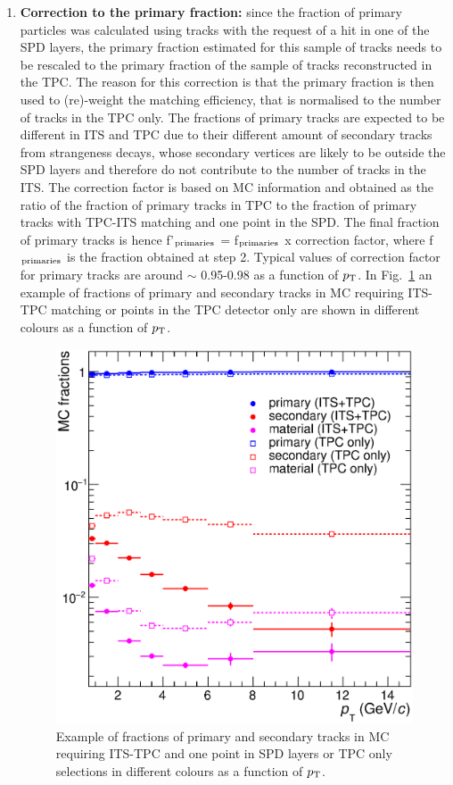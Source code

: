 \begin{enumerate}
\item {\bf Correction to the primary fraction:} since the fraction of primary
 particles was calculated using tracks with the request of a hit in one of the SPD layers, 
the primary fraction estimated for this sample of tracks 
needs to be rescaled to the primary fraction of the sample of tracks reconstructed in the TPC.
The reason for this correction is that the primary fraction is then used 
to (re)-weight the matching efficiency, that is normalised to the number of tracks in the TPC only. 
The fractions of primary tracks are expected to 
be different in ITS and TPC due to their different amount of 
secondary tracks from strangeness decays,
whose secondary vertices are likely to be outside the SPD layers and therefore do not contribute to the number of tracks in the ITS. 
The correction factor is based on MC information and obtained as 
the ratio of the fraction of primary tracks in TPC to the fraction of primary
 tracks with TPC-ITS matching and one point in the SPD. The final fraction of primary tracks is hence
  f'$_{\rm primaries}$ = f$_{\rm primaries}$ x correction factor, 
  where f$_{\rm primaries}$ is the fraction obtained at step 2. 
  Typical values of correction factor for primary tracks are around $\sim$ 0.95-0.98
  as a function of $p_{\rm T}$. 
  In Fig.~\ref{fig:MCfractions} an example of fractions of primary 
  and secondary tracks in MC requiring ITS-TPC matching or points in the TPC detector only are 
  shown in different colours as a function of $p_{\rm T}$.
\begin{figure}[!htb]
\begin{center}
\includegraphics[width=.50\textwidth]{FigCap4/MCfractions_ESDTrOnly_VsPt_PiK.eps}
\caption{Example of fractions of primary and secondary tracks in MC requiring ITS-TPC and one point in SPD layers or TPC only selections in different colours as a function of $p_{\rm T}$.}
\label{fig:MCfractions}
\end{center}
\end{figure}


\end{enumerate}
